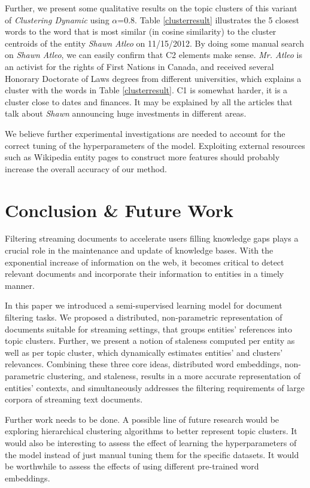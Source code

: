 \documentclass{sig-alternate}
\begin{document}
{{Further, we present some qualitative results on the topic clusters of this variant of {\textit{Clustering Dynamic}} using $\alpha\mathord{=}0.8$. Table \ref{clusterresult} illustrates the 5 closest words to the word that is most similar (in cosine similarity) to the cluster centroids of the entity \emph{Shawn Atleo} on 11/15/2012.
By doing some manual search on \emph{Shawn Atleo}, we can easily confirm that C2 elements make sense. \emph{Mr. Atleo} is an activist for the rights of First Nations in Canada, and received several Honorary Doctorate of Laws degrees from different universities, which explains a cluster with the words in Table \ref{clusterresult}. C1 is somewhat harder, it is a cluster close to dates and finances. It may be explained by all the articles that talk about \emph{Shawn} announcing huge investments in different areas.

We believe further experimental investigations are needed to account for the correct tuning of the hyperparameters of the model. Exploiting external resources such as Wikipedia entity pages to construct more features \cite{xitong12} should probably increase the overall accuracy of our method. 

\section{Conclusion \& Future Work}
\label{conclusion}

Filtering streaming documents to accelerate users filling knowledge gaps plays a crucial role in the maintenance and update of knowledge bases.
With the exponential increase of information on the web, it becomes critical to detect relevant documents and incorporate their information to entities in a timely manner. %

In this paper we introduced a semi-supervised learning model for document filtering tasks. We proposed a distributed, non-parametric representation of documents suitable for streaming settings, that groups entities' references into topic clusters. Further, we present a notion of staleness computed per entity as well as per topic cluster, which dynamically estimates entities' and clusters' relevances.
Combining these three core ideas, distributed word embeddings, non-parametric clustering, and staleness, results in a more accurate representation of entities' contexts, and simultaneously addresses the filtering requirements of large corpora of streaming text documents.

Further work needs to be done. A possible line of future research would be exploring hierarchical clustering algorithms to better represent topic clusters. It would also be interesting to assess the effect of learning the hyperparameters of the model instead of just manual tuning them for the specific datasets.
It would be worthwhile to assess the effects of using different pre-trained word embeddings.

}}
\end{document}
